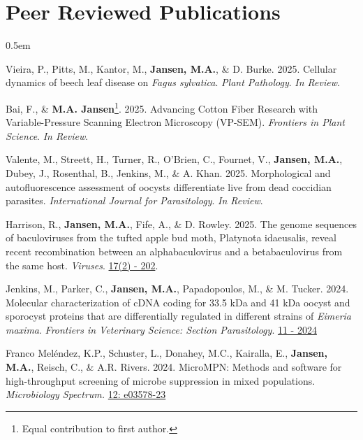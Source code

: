 \documentclass[12pt,a4paper]{article}
\begin{document}
\section*{Peer Reviewed Publications}
	\begin{description}
		\itemsep 0.5em
		
		\item  Vieira, P., Pitts, M., Kantor, M., \textbf{Jansen, M.A.}, \& D. Burke. 2025. Cellular dynamics of beech leaf disease on \textit{Fagus sylvatica}. \textit{Plant Pathology}. \textit{In Review}.
		
		\item Bai, F., \& \textbf{M.A. Jansen}\footnote[2]{Equal contribution to first author.}. 2025. Advancing Cotton Fiber Research with Variable-Pressure Scanning Electron Microscopy (VP-SEM). \textit{Frontiers in Plant Science}. \textit{In Review}.
		
		\item Valente, M., Streett, H., Turner, R., O’Brien, C., Fournet, V., \textbf{Jansen, M.A.}, Dubey, J., Rosenthal, B., Jenkins, M., \& A. Khan. 2025. Morphological and autofluorescence assessment of oocysts differentiate live from dead coccidian parasites. \textit{International Journal for Parasitology}. \textit{In Review}.
		
		\item Harrison, R., \textbf{Jansen, M.A.}, Fife, A., \& D. Rowley. 2025. The genome sequences of baculoviruses from the tufted apple bud moth, Platynota idaeusalis, reveal recent recombination between 
		an alphabaculovirus and a betabaculovirus from the same host. \textit{Viruses}. \href{https://doi.org/10.3390/v17020202}{17(2) - 202}.
		
		\item Jenkins, M., Parker, C., \textbf{Jansen, M.A.}, Papadopoulos, M., \& M. Tucker. 2024. Molecular characterization of cDNA coding for 33.5 kDa and 41 kDa oocyst and sporocyst proteins that are differentially regulated in different strains of \textit{Eimeria maxima}. \textit{Frontiers in Veterinary Science: Section Parasitology}. \href{https://doi.org/10.3389/fvets.2024.1445646}{11 - 2024}
		
		\item Franco Mel\'{e}ndez, K.P., Schuster, L., Donahey, M.C., Kairalla, E., \textbf{Jansen, M.A.}, Reisch, C., \& A.R. Rivers. 2024. MicroMPN: Methods and software for high-throughput screening of microbe suppression in mixed populations. \textit{Microbiology Spectrum.} \href{https://doi.org/10.1128/spectrum.03578-23}{12: e03578-23}
		

\end{description}
\end{document}

